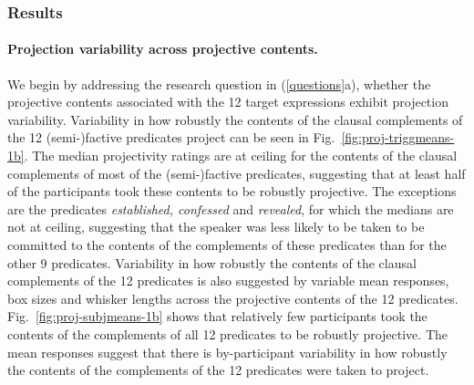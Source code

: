 \documentclass[11pt,fleqn]{article}
\newcommand{\6}{\mbox{$[\hspace*{-.6mm}[$}}
\newcommand{\9}{\mbox{$]\hspace*{-.6mm}]$}}
\newcommand{\figref}[1]{Fig.~\ref{#1}}
\begin{document}
\subsubsection{Results}

\paragraph{Projection variability across projective contents.} We begin by addressing the research question in (\ref{questions}a), whether the projective contents associated with the 12 target expressions exhibit projection variability. Variability in how robustly the contents of the clausal complements of the 12 (semi-)factive predicates project can be seen in \figref{fig:proj-triggmeans-1b}. The median projectivity ratings are at ceiling for the contents of the clausal complements of most of the (semi-)factive predicates, suggesting that at least half of the participants took these contents to be robustly projective. The exceptions are the predicates {\em established, confessed} and {\em revealed}, for which the medians are not at ceiling, suggesting that the speaker was less likely to be taken to be committed to the contents of the complements of these predicates than for the other 9 predicates. Variability in how robustly the contents of the clausal complements of the 12 predicates is also suggested by variable mean responses, box sizes and whisker lengths across the projective contents of the 12 predicates. \figref{fig:proj-subjmeans-1b} shows that relatively few participants took the contents of the complements of all 12 predicates to be robustly projective. The mean responses suggest that there is by-participant variability in how robustly the contents of the complements of the 12 predicates were taken to project.
\end{document}
